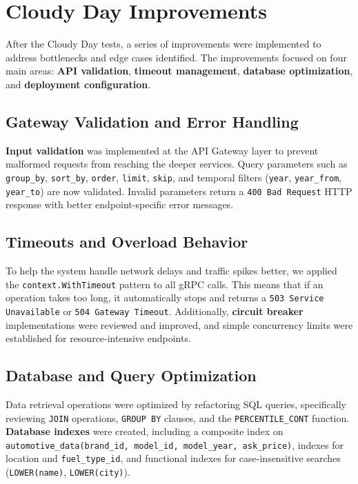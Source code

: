 \chapter{Cloudy Day Improvements} \label{cap:improvements}

After the Cloudy Day tests, a series of improvements were implemented to address bottlenecks and edge cases identified. The improvements focused on four main areas: \textbf{API validation}, \textbf{timeout management}, \textbf{database optimization}, and \textbf{deployment configuration}.

\section{Gateway Validation and Error Handling}

\textbf{Input validation} was implemented at the API Gateway layer to prevent malformed requests from reaching the deeper services. Query parameters such as \texttt{group\_by}, \texttt{sort\_by}, \texttt{order}, \texttt{limit}, \texttt{skip}, and temporal filters (\texttt{year}, \texttt{year\_from}, \texttt{year\_to}) are now validated. Invalid parameters return a \texttt{400 Bad Request} HTTP response with better endpoint-specific error messages.

\section{Timeouts and Overload Behavior}

To help the system handle network delays and traffic spikes better, we applied the \texttt{context.WithTimeout} pattern to all gRPC calls. This means that if an operation takes too long, it automatically stops and returns a \texttt{503 Service Unavailable} or \texttt{504 Gateway Timeout}. Additionally, \textbf{circuit breaker} implementations were reviewed and improved, and simple concurrency limits were established for resource-intensive endpoints.

\section{Database and Query Optimization}

Data retrieval operations were optimized by refactoring SQL queries, specifically reviewing \texttt{JOIN} operations, \texttt{GROUP BY} clauses, and the \texttt{PERCENTILE\_CONT} function. \textbf{Database indexes} were created, including a composite index on \texttt{automotive\_data(brand\_id, model\_id, model\_year, ask\_price)}, indexes for location and \texttt{fuel\_type\_id}, and functional indexes for case-insensitive searches (\texttt{LOWER(name)}, \texttt{LOWER(city)}).


